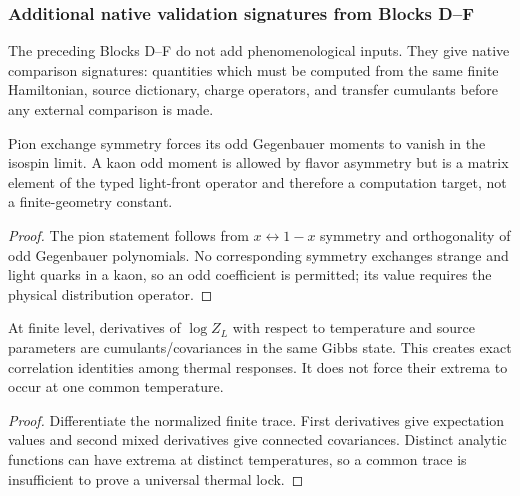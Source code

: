 \documentclass[12pt,a4paper]{article}
\begin{document}
\subsubsection{Additional native validation signatures from Blocks D--F}
\label{p11:subsec:additional-native-validation-signatures-blocks-d-f}

The preceding Blocks D--F do not add phenomenological inputs.  They give native
comparison signatures: quantities which must be computed from the same finite
Hamiltonian, source dictionary, charge operators, and transfer cumulants before
any external comparison is made.

\begin{corollary}
\label{p11:cor:distribution-moment-fingerprint-kaon-odd}

Pion exchange symmetry forces its odd Gegenbauer moments to vanish in the isospin limit.  A kaon odd moment is allowed by flavor asymmetry but is a matrix element of the typed light-front operator and therefore a computation target, not a finite-geometry constant.
\label{p11:eq:distribution-moment-fingerprint-general}
\label{p11:eq:a1-xi-moment-fingerprint}
\label{p11:eq:pion-odd-moment-zero-fingerprint}
\label{p11:eq:kaon-odd-moment-native-readout}
\end{corollary}
\begin{proof}

The pion statement follows from \(x\leftrightarrow1-x\) symmetry and orthogonality of odd Gegenbauer polynomials.  No corresponding symmetry exchanges strange and light quarks in a kaon, so an odd coefficient is permitted; its value requires the physical distribution operator.
\end{proof}

\begin{corollary}
\label{p11:cor:single-trace-thermal-lock-signature}

At finite level, derivatives of \(\log Z_L\) with respect to temperature and source parameters are cumulants/covariances in the same Gibbs state.  This creates exact correlation identities among thermal responses.  It does not force their extrema to occur at one common temperature.
\label{p11:eq:thermal-lock-vector}
\label{p11:eq:thermal-lock-response-definitions}
\end{corollary}
\begin{proof}

Differentiate the normalized finite trace.  First derivatives give expectation values and second mixed derivatives give connected covariances.  Distinct analytic functions can have extrema at distinct temperatures, so a common trace is insufficient to prove a universal thermal lock.
\end{proof}
\end{document}
